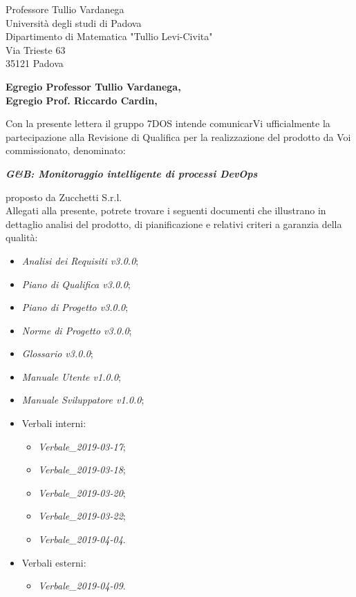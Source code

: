 \begin{letter}{Professore Tullio Vardanega \\ Università degli studi di Padova \\ Dipartimento di Matematica "Tullio Levi-Civita" \\ Via Trieste 63 \\ 35121 Padova}
\opening{\textbf{Egregio Professor Tullio Vardanega,\\Egregio Prof. Riccardo Cardin,}}
\begin{addmargin}[2em]{2em}
  Con la presente lettera il gruppo 7DOS intende comunicarVi ufficialmente la partecipazione alla Revisione di Qualifica per la realizzazione del prodotto da Voi commissionato, denominato:
   \singlespacing 
   \centerline{\textbf{\emph{G\&B: Monitoraggio intelligente di processi DevOps}}}
  \singlespacing
  proposto da Zucchetti S.r.l. \\
  Allegati alla presente, potrete trovare i seguenti documenti che illustrano in dettaglio analisi del prodotto, di pianificazione e relativi criteri a garanzia della qualità:
      \begin{itemize}
	      \item \emph{Analisi dei Requisiti v3.0.0};
	      \item \emph{Piano di Qualifica v3.0.0};
	      \item \emph{Piano di Progetto v3.0.0};
	      \item \emph{Norme di Progetto v3.0.0};
	      \item \emph{Glossario v3.0.0};
	      \item \emph{Manuale Utente v1.0.0};
   	      \item \emph{Manuale Sviluppatore v1.0.0};
	      \item Verbali interni:
	            \begin{itemize}
		           	\item \emph{Verbale\_2019-03-17};
		           	\item \emph{Verbale\_2019-03-18};
		           	\item \emph{Verbale\_2019-03-20};
		           	\item \emph{Verbale\_2019-03-22};
		           	\item \emph{Verbale\_2019-04-04}.
	           	\end{itemize}
          \item Verbali esterni:
          \begin{itemize}
          	\item \emph{Verbale\_2019-04-09}.
          \end{itemize}
	\end{itemize}


\end{addmargin}
\end{letter}

